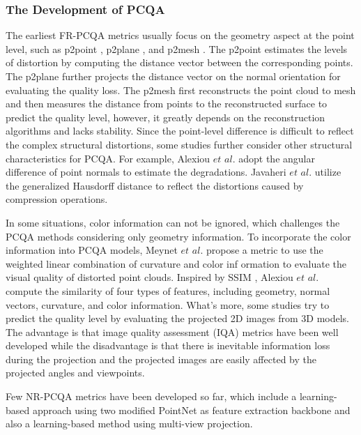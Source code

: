\documentclass[lettersize,journal]{IEEEtran}
\begin{document}
\subsubsection{The Development of PCQA}
The earliest FR-PCQA metrics usually focus on the geometry aspect at the point level, such as p2point \cite{p2point}, p2plane \cite{p2plane}, and p2mesh \cite{p2mesh}. The p2point estimates the levels of distortion by computing the distance vector between the corresponding points. The p2plane further projects the distance vector on the normal orientation for evaluating the quality loss. The p2mesh first reconstructs the point cloud to mesh and then measures the distance from points to the reconstructed surface to predict the quality level, however, it greatly depends on the reconstruction algorithms and lacks stability. Since the point-level difference is difficult to reflect the complex structural distortions, some studies further consider other structural characteristics for PCQA. For example, Alexiou $et$ $al.$ \cite{angular} adopt the angular difference of point normals to estimate the degradations. Javaheri $et$ $al.$ \cite{pcqa2} utilize the generalized Hausdorff distance to reflect the distortions caused by compression operations.

In some situations, color information can not be ignored, which challenges the PCQA methods considering only geometry information. To incorporate the color information into PCQA models, Meynet $et$ $al.$ \cite{pcqm} propose a metric to use the weighted linear combination of curvature and color inf ormation to evaluate the visual quality of distorted point clouds. Inspired by SSIM \cite{ssim}, Alexiou $et$ $al.$ \cite{pcqa3} compute the similarity of four types of features, including geometry, normal vectors, curvature, and color information. What's more, some studies  \cite{sjtu-pcqa} \cite{pcqa_database2} try to predict the quality level by evaluating the projected 2D images from 3D models. The advantage is that image quality assessment (IQA) metrics have been well developed while the disadvantage is that there is inevitable information loss during the projection and the projected images are easily affected by the projected angles and viewpoints.

Few NR-PCQA metrics have been developed so far, which include a learning-based approach \cite{pcqa-large-scale} using two modified PointNet \cite{Qi_2017_CVPR} as feature extraction backbone and also a learning-based method \cite{liu2021pqa} using multi-view projection. 
\end{document}

